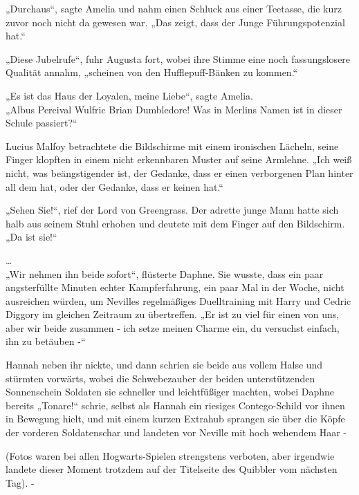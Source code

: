 {„Durchaus“, sagte Amelia und nahm einen Schluck aus einer Teetasse, die kurz zuvor noch nicht da gewesen war. „Das zeigt, dass der Junge Führungspotenzial hat.“

„Diese Jubelrufe“, fuhr Augusta fort, wobei ihre Stimme eine noch fassungslosere Qualität annahm, „scheinen von den Hufflepuff-Bänken zu kommen.“

„Es ist das Haus der Loyalen, meine Liebe“, sagte Amelia.\\ „Albus Percival Wulfric Brian Dumbledore! Was in Merlins Namen ist in dieser Schule passiert?“

Lucius Malfoy betrachtete die Bildschirme mit einem ironischen Lächeln, seine Finger klopften in einem nicht erkennbaren Muster auf seine Armlehne. „Ich weiß nicht, was beängstigender ist, der Gedanke, dass er einen verborgenen Plan hinter all dem hat, oder der Gedanke, dass er keinen hat.“

„Sehen Sie!“, rief der Lord von Greengrass. Der adrette junge Mann hatte sich halb aus seinem Stuhl erhoben und deutete mit dem Finger auf den Bildschirm. „Da ist sie!“

…\\ „Wir nehmen ihn beide sofort“, flüsterte Daphne. Sie wusste, dass ein paar angsterfüllte Minuten echter Kampferfahrung, ein paar Mal in der Woche, nicht ausreichen würden, um Nevilles regelmäßiges Duelltraining mit Harry und Cedric Diggory im gleichen Zeitraum zu übertreffen. „Er ist zu viel für einen von uns, aber wir beide zusammen - ich setze meinen Charme ein, du versuchst einfach, ihn zu betäuben -“

Hannah neben ihr nickte, und dann schrien sie beide aus vollem Halse und stürmten vorwärts, wobei die Schwebezauber der beiden unterstützenden Sonnenschein Soldaten sie schneller und leichtfüßiger machten, wobei Daphne bereits „Tonare!“ schrie, selbst als Hannah ein riesiges Contego-Schild vor ihnen in Bewegung hielt, und mit einem kurzen Extrahub sprangen sie über die Köpfe der vorderen Soldatenschar und landeten vor Neville mit hoch wehendem Haar -

(Fotos waren bei allen Hogwarts-Spielen strengstens verboten, aber irgendwie landete dieser Moment trotzdem auf der Titelseite des Quibbler vom nächsten Tag). -

}
